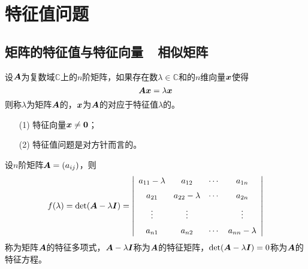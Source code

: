\section{特征值问题}
\subsection{矩阵的特征值与特征向量~~相似矩阵}


\begin{frame}[fragile]\ft{\subsecname}


  \begin{dingyi}[特征值与特征向量]
    设$\boldsymbol{A}$为复数域$\mathbb C$上的$n$阶矩阵，如果存在数$\lambda\in\mathbb C$和的$n$维向量${\boldsymbol{x}}$使得
    $$
    \boldsymbol{A}{\boldsymbol{x}}=\lambda{\boldsymbol{x}}
    $$
    则称$\lambda$为矩阵$\boldsymbol{A}$的，${\boldsymbol{x}}$为$\boldsymbol{A}$的对应于特征值$\lambda$的。
  \end{dingyi} 
  
  \begin{zhu}
    \begin{itemize}
  \item[(1)] 特征向量${\boldsymbol{x}}\ne\boldsymbol{0}$；
  \item[(2)] 特征值问题是对方针而言的。 
  \end{itemize}
  \end{zhu}
\end{frame}


\begin{frame}[fragile]

  \begin{dingyi}
    设$n$阶矩阵$\boldsymbol{A}=(a_{ij})$，则
    $$
    f(\lambda)=\mathrm{det}(\boldsymbol{A}-\lambda\boldsymbol{I})
    =\left|
      \begin{array}{cccc}
                    a_{11}-\lambda&a_{12}&\cdots&a_{1n}\\[0.2cm]
                    a_{21}&a_{22}-\lambda&\cdots&a_{2n}\\[0.2cm]
                    \vdots&\vdots&&\vdots\\[0.2cm]
                    a_{n1}&a_{n2}&\cdots&a_{nn}-\lambda
                                                 \end{array}
                                                                                  \right|
                                                                                  $$
                                                                                  称为矩阵$\boldsymbol{A}$的特征多项式，$\boldsymbol{A}-\lambda\boldsymbol{I}$称为$\boldsymbol{A}$的特征矩阵，$\mathrm{det}(\boldsymbol{A}-\lambda\boldsymbol{I})=0$称为$\boldsymbol{A}$的特征方程。
                                                                                  \end{dingyi}

\end{frame}


